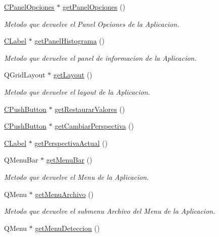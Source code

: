 \begin{DoxyCompactItemize}
\hyperlink{classCPanelOpciones}{C\+Panel\+Opciones} $\ast$ \hyperlink{classCAplicacion_a105f731579e2c93cdd5826fee8a90660}{get\+Panel\+Opciones} ()
\begin{DoxyCompactList}\small\item\em Metodo que devuelve el Panel Opciones de la Aplicacion. \end{DoxyCompactList}\item 
\hyperlink{classCLabel}{C\+Label} $\ast$ \hyperlink{classCAplicacion_a9cb501579c4725ffcc2708c824dca71c}{get\+Panel\+Histograma} ()
\begin{DoxyCompactList}\small\item\em Metodo que devuelve el panel de informacion de la Aplicacion. \end{DoxyCompactList}\item 
Q\+Grid\+Layout $\ast$ \hyperlink{classCAplicacion_af8687ea0c860ca7df1f0189f932ea93d}{get\+Layout} ()
\begin{DoxyCompactList}\small\item\em Metodo que devuelve el layout de la Aplicacion. \end{DoxyCompactList}\item 
\hyperlink{classCPushButton}{C\+Push\+Button} $\ast$ \hyperlink{classCAplicacion_ae2c72117268933c3f63feb67e97fa49a}{get\+Restaurar\+Valores} ()
\item 
\hyperlink{classCPushButton}{C\+Push\+Button} $\ast$ \hyperlink{classCAplicacion_aa296c51c5a905ce1f807598f379ce401}{get\+Cambiar\+Perspectiva} ()
\item 
\hyperlink{classCLabel}{C\+Label} $\ast$ \hyperlink{classCAplicacion_a5db483cd8a88bdd014d95c7ae34353a6}{get\+Perspectiva\+Actual} ()
\item 
Q\+Menu\+Bar $\ast$ \hyperlink{classCAplicacion_a8b8ddfe3c7112cd0645926fe3c628c7f}{get\+Menu\+Bar} ()
\begin{DoxyCompactList}\small\item\em Metodo que devuelve el Menu de la Aplicacion. \end{DoxyCompactList}\item 
Q\+Menu $\ast$ \hyperlink{classCAplicacion_a9eb944127e33a2f045b59875c1920756}{get\+Menu\+Archivo} ()
\begin{DoxyCompactList}\small\item\em Metodo que devuelve el submenu Archivo del Menu de la Aplicacion. \end{DoxyCompactList}\item 
Q\+Menu $\ast$ \hyperlink{classCAplicacion_a004bdd0f71172449e07666b97fd7c46e}{get\+Menu\+Deteccion} ()

\end{DoxyCompactItemize}
